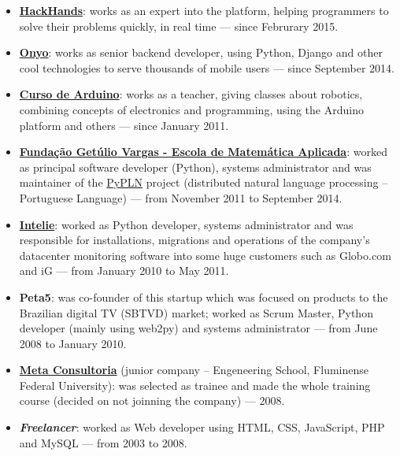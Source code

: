 \documentclass[a4paper,11pt]{article}
\begin{document}
	\begin{itemize}
		\item \href{http://hackhands.com}{\textbf{HackHands}}: works as an
			expert into the platform, helping programmers to solve their
			problems quickly, in real time --- since Februrary 2015.
		\item \href{http://onyo.com}{\textbf{Onyo}}: works as senior backend
			developer, using Python, Django and other cool technologies to
			serve thousands of mobile users --- since September 2014.
		\item \href{http://www.cursodearduino.com.br/}{\textbf{Curso de
			Arduino}}: works as a teacher, giving classes about robotics,
			combining concepts of electronics and programming, using the
			Arduino platform and others --- since January 2011.
		\item \href{http://emap.fgv.br/}{\textbf{Fundação Getúlio Vargas -
			Escola de Matemática Aplicada}}: worked as principal software
			developer (Python), systems administrator and was maintainer of the
			\href{http://pypln.org/}{PyPLN} project (distributed natural
			language processing -- Portuguese Language) --- from November 2011
			to September 2014.
		\item \href{http://www.intelie.com.br/}{\textbf{Intelie}}: worked as
			Python developer, systems administrator and was responsible for
			installations, migrations and operations of the company's
			datacenter monitoring software into some huge customers such as
			Globo.com and iG --- from January 2010 to May 2011.
		\item \textbf{Peta5}: was co-founder of this startup which was focused
			on products to the Brazilian digital TV (SBTVD) market; worked as
			Scrum Master, Python developer (mainly using web2py) and systems
			administrator --- from June 2008 to January 2010.
		\item \href{http://www.metaconsultoria.com/}{\textbf{Meta Consultoria}}
			(junior company -- Engeneering School, Fluminense Federal
			University): was selected as trainee and made the whole training
			course (decided on not joinning the company) --- 2008.
		\item \textbf{\textit{Freelancer}}: worked as Web developer using HTML,
			CSS, JavaScript, PHP and MySQL --- from 2003 to 2008.
	\end{itemize}
\end{document}
